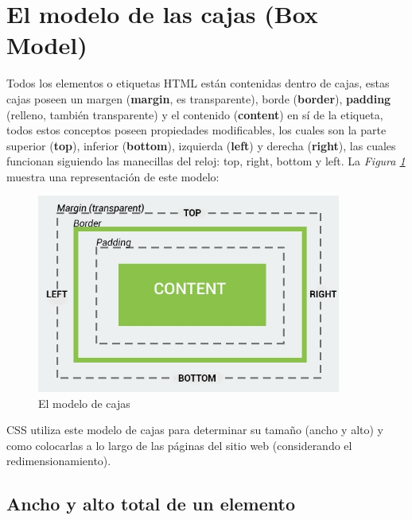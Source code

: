 \section{El modelo de las cajas (Box Model)}

Todos los elementos o etiquetas HTML están contenidas dentro de cajas, estas cajas poseen un margen (\textbf{margin}, es transparente), borde (\textbf{border}), \textbf{padding} (relleno, también transparente) y el contenido (\textbf{content}) en sí de la etiqueta, todos estos conceptos poseen propiedades modificables, los cuales son la parte superior (\textbf{top}), inferior (\textbf{bottom}), izquierda (\textbf{left}) y derecha (\textbf{right}), las cuales funcionan siguiendo las manecillas del reloj: top, right, bottom y left. La \textit{Figura \ref{fig: 19}} muestra una representación de este modelo:
\begin{figure}[H]
    \centering
    \caption{El modelo de cajas}
    \label{fig: 19}
    \includegraphics[width=10cm]{ss/box-model.png}
\end{figure}

CSS utiliza este modelo de cajas para determinar su tamaño (ancho y alto) y como colocarlas a lo largo de las páginas del sitio web (considerando el redimensionamiento).


\subsection{Ancho y alto total de un elemento}

